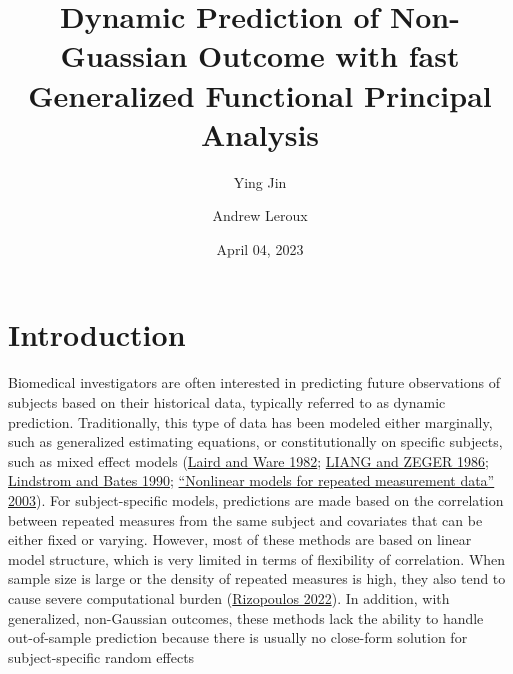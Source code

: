 \documentclass[
  11pt,
]{article}
\title{Dynamic Prediction of Non-Guassian Outcome with fast Generalized
Functional Principal Analysis}
\author{Ying Jin \and Andrew Leroux}
\date{April 04, 2023}
\begin{document}
\maketitle

\hypertarget{introduction}{%
\section{Introduction}\label{introduction}}

Biomedical investigators are often interested in predicting future
observations of subjects based on their historical data, typically
referred to as dynamic prediction. Traditionally, this type of data has
been modeled either marginally, such as generalized estimating
equations, or constitutionally on specific subjects, such as mixed
effect models (\protect\hyperlink{ref-Laird1982}{Laird and Ware 1982};
\protect\hyperlink{ref-liang1986}{LIANG and ZEGER 1986};
\protect\hyperlink{ref-lindstrom1990}{Lindstrom and Bates 1990};
\protect\hyperlink{ref-davidian2003}{{``Nonlinear models for repeated
measurement data''} 2003}). For subject-specific models, predictions are
made based on the correlation between repeated measures from the same
subject and covariates that can be either fixed or varying. However,
most of these methods are based on linear model structure, which is very
limited in terms of flexibility of correlation. When sample size is
large or the density of repeated measures is high, they also tend to
cause severe computational burden
(\protect\hyperlink{ref-GLMMadaptive}{Rizopoulos 2022}). In addition,
with generalized, non-Gaussian outcomes, these methods lack the ability
to handle out-of-sample prediction because there is usually no
close-form solution for subject-specific random effects
\end{document}
